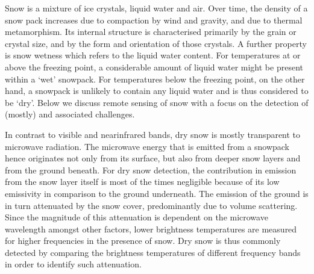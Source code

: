\documentclass[letterpaper,10pt,english]{jupyterBook}
\begin{document}
\sphinxAtStartPar
Snow is a mixture of ice crystals, liquid water and air.
Over time, the density of a snow pack increases due to compaction by wind and gravity, and due to thermal metamorphism.
Its internal structure is characterised primarily by the grain or crystal size, and by the form and orientation of those crystals.
A further property is snow wetness which refers to the liquid water content.
For temperatures at or above the freezing point, a considerable amount of liquid water might be present within a ‘wet’ snowpack.
For temperatures below the freezing point, on the other hand, a snowpack is unlikely to contain any liquid water and is thus considered to be ‘dry’.
Below we discuss {\hyperref[\detokenize{book/acronyms:term-PMW}]{}} remote sensing of snow with a focus on the detection of (mostly) {\hyperref[\detokenize{book/definitions:term-Dry-snow}]{}} and associated challenges.

\sphinxAtStartPar
In contrast to visible and near\sphinxhyphen{}infrared bands, dry snow is mostly transparent to microwave radiation.
The microwave energy that is emitted from a snowpack hence originates not only from its surface, but also from deeper snow layers and from the ground beneath.
For dry snow detection, the contribution in emission from the snow layer itself is most of the times negligible because of its low emissivity in comparison to the ground underneath.
The emission of the ground is in turn attenuated by the snow cover, predominantly due to volume scattering.
Since the magnitude of this attenuation is dependent on the microwave wavelength amongst other factors, lower brightness temperatures are measured for higher frequencies in the presence of snow.
Dry snow is thus commonly detected by comparing the brightness temperatures of different frequency bands in order to identify such attenuation.
\end{document}
